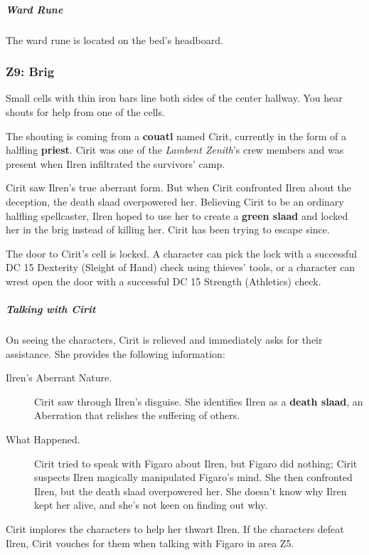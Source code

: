 \documentclass[10pt,a4paper,twoside,bg=print,twocolumn,openany,nodeprecatedcode]{dndbook}
\begin{document}
\subparagraph{Ward Rune}
The ward rune is located on the bed's headboard.

\subsubsection{Z9: Brig}
\begin{DndReadAloud}{}
Small cells with thin iron bars line both sides of the center hallway. You hear shouts for help from one of the cells.

\end{DndReadAloud}

The shouting is coming from a \textbf{couatl} named Cirit, currently in the form of a halfling \textbf{priest}. Cirit was one of the \textit{Lambent Zenith}'s crew members and was present when Ilren infiltrated the survivors' camp.

Cirit saw Ilren's true aberrant form. But when Cirit confronted Ilren about the deception, the death slaad overpowered her. Believing Cirit to be an ordinary halfling spellcaster, Ilren hoped to use her to create a \textbf{green slaad} and locked her in the brig instead of killing her. Cirit has been trying to escape since.

The door to Cirit's cell is locked. A character can pick the lock with a successful DC 15 Dexterity (Sleight of Hand) check using thieves' tools, or a character can wrest open the door with a successful DC 15 Strength (Athletics) check.

\subparagraph{Talking with Cirit}
On seeing the characters, Cirit is relieved and immediately asks for their assistance. She provides the following information:


\begin{description}
\item[Ilren's Aberrant Nature.]
Cirit saw through Ilren's disguise. She identifies Ilren as a \textbf{death slaad}, an Aberration that relishes the suffering of others.
\item[What Happened.]
Cirit tried to speak with Figaro about Ilren, but Figaro did nothing; Cirit suspects Ilren magically manipulated Figaro's mind. She then confronted Ilren, but the death slaad overpowered her. She doesn't know why Ilren kept her alive, and she's not keen on finding out why.
\end{description}

Cirit implores the characters to help her thwart Ilren. If the characters defeat Ilren, Cirit vouches for them when talking with Figaro in area Z5.
\end{document}

